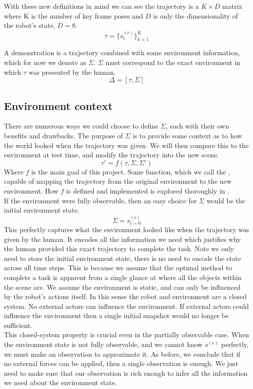 With these new definitions in mind we can see the trajectory is a $K \times D$ matrix where K is the number of key frame poses and $D$ is only the dimensionality of the robot's state, $D = 8$.
$$\tau = \{s^{(r)}_t\}_{k=1}^K$$

A demonstration is a trajectory combined with some environment information, which for now we denote as $\Sigma$. $\Sigma$ must correspond to the exact environment in which $\tau$ was presented by the human.
$$\Delta = [\tau, \Sigma]$$

\subsection{Environment context}
There are numerous ways we could choose to define $\Sigma$, each with their own benefits and drawbacks. The purpose of $\Sigma$ is to provide some context as to how the world looked when the trajectory was given. We will then compare this to the environment at test time, and modify the trajectory into the new scene.
$$\tau' = f(\tau, \Sigma, \Sigma')$$
Where $f$ is the main goal of this project. Some function, which we call the , capable of mapping the trajectory from the original environment to the new environment. How $f$ is defined and implemented is explored thoroughly in .\\

If the environment were fully observable, then an easy choice for $\Sigma$ would be the initial environment state.
$$\Sigma = s^{(e)}_{t=0}$$
This perfectly captures what the environment looked like when the trajectory was given by the human. It encodes all the information we need which justifies why the human provided this exact trajectory to complete the task. Note we only need to store the initial environment state, there is no need to encode the state across all time steps. This is because we assume that the optimal method to complete a task is apparent from a single glance at where all the objects within the scene are. We assume the environment is static, and can only be influenced by the robot's actions itself. In this sense the robot and environment are a closed system. No external actors can influence the environment. If external actors could influence the environment then a single initial snapshot would no longer be sufficient.\\

This closed-system property is crucial even in the partially observable case. When the environment state is not fully observable, and we cannot know $s^{(e)}$ perfectly, we must make an observation to approximate it. As before, we conclude that if no external forces can be applied, then a single observation is enough. We just need to make sure that our observation is rich enough to infer all the information we need about the environment state.\\

